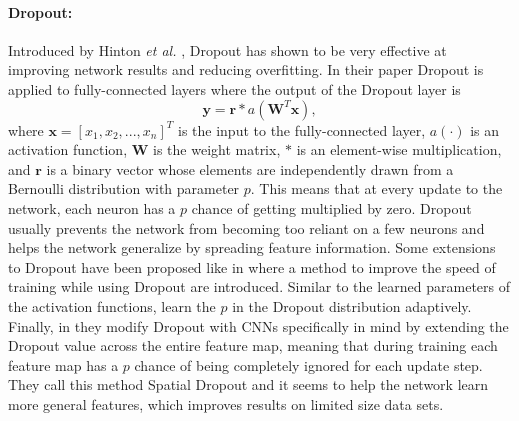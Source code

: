 \paragraph{Dropout:}
Introduced by Hinton \textit{et al.} \cite{hinton2012improving}, Dropout has shown to be very effective at improving network results and reducing overfitting. 
In their paper Dropout is applied to fully-connected layers where the output of the Dropout layer is 
\begin{equation}
\textbf{y} = \textbf{r} \ast a(\textbf{W}^T\textbf{x}), 
\label{eq:dropout}
\end{equation}
where $\textbf{x} = [x_1,x_2,...,x_n]^T$ is the input to the fully-connected layer, $a(\cdot)$ is an activation function, $\textbf{W}$ is the weight matrix, $\ast$ is an element-wise multiplication, and $\textbf{r}$ is a binary vector whose elements are independently drawn from a Bernoulli distribution with parameter $p$. 
This means that at every update to the network, each neuron has a $p$ chance of getting multiplied by zero. 
Dropout usually prevents the network from becoming too reliant on a few neurons and helps the network generalize by spreading feature information. 
Some extensions to Dropout have been proposed like in \cite{wang2013fast} where a method to improve the speed of training while using Dropout are introduced. 
Similar to the learned parameters of the activation functions, \cite{ba2013adaptive} learn the $p$ in the Dropout distribution adaptively. 
Finally, in \cite{tompson2015efficient} they modify Dropout with CNNs specifically in mind by extending the Dropout value across the entire feature map, meaning that during training each feature map has a $p$ chance of being completely ignored for each update step. 
They call this method Spatial Dropout and it seems to help the network learn more general features, which improves results on limited size data sets.

